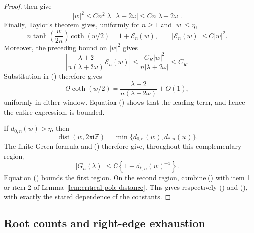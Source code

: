 \documentclass[twoside,10pt]{article}
\numberwithin{equation}{section}
\theoremstyle{slbody}
\theoremstyle{definition}
\theoremstyle{remark}
\newcommand{\Z}{\mathbb Z}
\renewcommand{\eqref}[1]{%
  \textup{{\normalfont(\oldstylenums{\ref{#1}}}\normalfont)}}
\begin{document}
\begin{proof}
then give
\[
 |w|^2\le Cn^2|\lambda|\,|\lambda+2\omega|
       \le Cn|\lambda+2\omega|.
\]
Finally, Taylor's theorem gives, uniformly for $n\ge1$ and
$|w|\le\eta$,
\[
 n\tanh\!\left(\frac{w}{2n}\right)\coth(w/2)
 =1+\mathcal E_n(w),
 \qquad |\mathcal E_n(w)|\le C|w|^2.
\]
Moreover, the preceding bound on $|w|^2$ gives
\[
 \left|
  \frac{\lambda+2}{n(\lambda+2\omega)}\mathcal E_n(w)
 \right|
 \le \frac{C_R|w|^2}{n|\lambda+2\omega|}
 \le C_R.
\]
Substitution in \eqref{eq:critical-zero-exact-factorization} therefore
gives
\begin{equation}\label{eq:critical-zero-cancellation}
 \Theta\coth(w/2)=
   \frac{\lambda+2}{n(\lambda+2\omega)}+O(1),
\end{equation}
uniformly in either window.  Equation
\eqref{eq:critical-tumble-distance} shows that the leading term, and
hence the entire expression, is bounded.

If $d_{0,n}(w)>\eta$, then
\[
 \operatorname{dist}(w,2\pi\mathrm i\Z)
 =\min\{d_{0,n}(w),d_{*,n}(w)\}.
\]
The finite Green formula and \eqref{eq:coth-distance-bound} therefore
give, throughout this complementary region,
\begin{equation}\label{eq:critical-green-distance-reduction}
 |G_n(\lambda)|\le C\left\{1+
       d_{*,n}(w)^{-1}\right\}.
\end{equation}
Equation \eqref{eq:critical-zero-cancellation} bounds the first region.
On the second region, combine
\eqref{eq:critical-green-distance-reduction} with item 1 or item 2 of
Lemma~\ref{lem:critical-pole-distance}.  This gives respectively
\eqref{eq:critical-green-exclusion-bound} and
\eqref{eq:critical-green-exclusion-bound-super}, with exactly the
stated dependence of the constants.
\end{proof}

\subsection{Root counts and right-edge exhaustion}
\end{document}
